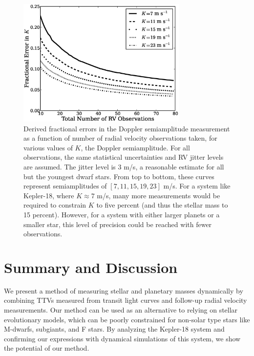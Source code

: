 \begin{figure}[htbp]
\centerline{\includegraphics[width=0.75\textwidth]{chapter2/f1.eps}}
\caption[Simulated RV precision as a function of the number of
observations for specified Doppler semiamplitudes]{Derived fractional errors in the Doppler semiamplitude measurement as a function of number of radial velocity observations taken, for various values of $K$, the Doppler semiamplitude. For all observations, the same statistical uncertainties and RV jitter levels are assumed. The jitter level is 3 m/s, a reasonable estimate for all but the youngest dwarf stars. From top to bottom, these curves represent semiamplitudes of $[7, 11, 15, 19, 23]$ m/s. For a system like Kepler-18, where $K \approx 7$ m/s, many more measurements would be required to constrain $K$ to five percent (and thus the stellar mass to 15 percent). However, for a system with either larger planets or a smaller star, this level of precision could be reached with fewer observations.
  }

\label{RVerrors}
\end{figure}



\section{Summary and Discussion}

\label{S:SD}

We present a  method of measuring stellar and planetary masses dynamically by combining TTVs measured from transit light curves and follow-up radial velocity measurements. Our method can be used as an alternative to relying on stellar evolutionary models, which can be poorly constrained for non-solar type stars like M-dwarfs, subgiants, and F stars. By analyzing the Kepler-18 system and confirming our expressions with dynamical simulations of this system, we show the potential of our method.


